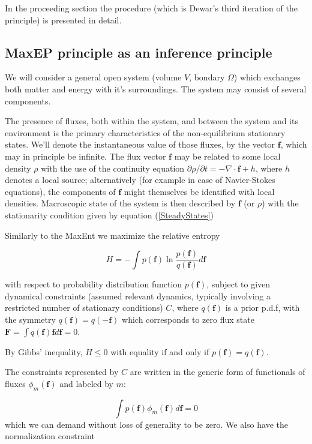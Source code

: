 \documentclass[a4paper,12pt]{article}
\begin{document}
In the proceeding section the procedure (which is Dewar's third iteration of the principle) is presented in detail.

\subsection{MaxEP principle as an inference principle}

We will consider a general open system (volume $V$, bondary $\Omega$) which exchanges both matter and energy with it's surroundings. The system may consist of several components.

The presence of fluxes, both within the system, and between the system and its environment is the primary characteristics of the non-equilibrium stationary states. We'll denote the instantaneous value of those fluxes, by the vector $\bm{f}$, which may in principle be infinite. The flux vector $\bm{f}$ may be related to some local density $\rho$ with the use of the continuity equation $\partial \rho / \partial t =  - \nabla \cdot \bm{f} + h$, where $h$ denotes a local source; alternatively (for example in case of Navier-Stokes equations), the components of $\bm{f}$ might themselves be identified with local densities. Macroscopic state of the system is then described by $\bm{f}$ (or $\rho$) with the stationarity condition given by equation (\ref{SteadyStates})

Similarly to the MaxEnt we maximize the relative entropy

\begin{equation}
  H = - \int p(\bm{f})\ln \frac{p(\bm{f})}{q(\bm{f})} d\bm{f}
\end{equation}

with respect to probability distribution function $p(\bm{f})$, subject to given dynamical constraints (assumed relevant dynamics, typically involving a restricted number of stationary conditions) $C$, where $q(\bm{f})$ is a prior p.d.f, with the symmetry $q(\bm{f}) =q(\bm{-f})$ which corresponds to zero flux state $\bm{F}= \int q(\bm{f}) \bm{f} d\bm{f}=0 $.

By Gibbs' inequality, $H \leq 0$ with equality if and only if $p(\bm{f})=q(\bm{f})$.


The constraints represented by $C$ are written in the generic form of functionals of fluxes $\phi_m(\bm{f})$ and labeled by $m$:

\begin{equation}
\label{Constrain1MEP}
  \int p(\bm{f})\phi_m(\bm{f})d\bm{f} =0
\end{equation}
which we can demand without loss of generality to be zero.
We also have the normalization constraint
\end{document}
